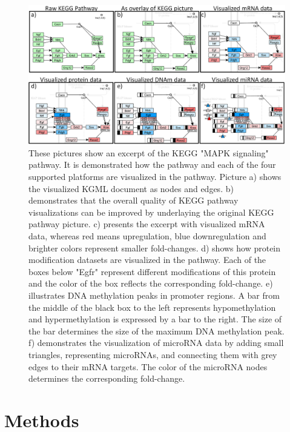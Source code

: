 \documentclass{bioinfo}
\begin{document}
\begin{figure}[t]
\centering
\includegraphics[width=1.0\textwidth]{figures/visualization-steps.png}
\caption{
These pictures show an excerpt of the KEGG "MAPK signaling" pathway. It is demonstrated how the pathway and each of the four supported platforms are visualized in the pathway. Picture a) shows the visualized KGML document as nodes and edges. b) demonstrates that the overall quality of KEGG pathway visualizations can be improved by underlaying the original KEGG pathway picture. c) presents the excerpt with visualized mRNA data, whereas red means upregulation, blue downregulation and brighter colors represent smaller fold-changes. d) shows how protein modification datasets are visualized in the pathway. Each of the boxes below "Egfr" represent different modifications of this protein and the color of the box reflects the corresponding fold-change. e) illustrates DNA methylation peaks in promoter regions. A bar from the middle of the black box to the left represents hypomethylation and hypermethylation is expressed by a bar to the right. The size of the bar determines the size of the maximum DNA methylation peak. f) demonstrates the visualization of microRNA data by adding small triangles, representing microRNAs, and connecting them with grey edges to their mRNA targets. The color of the microRNA nodes determines the corresponding fold-change.
}
\label{fig:visualization_steps}
\end{figure}


\section{Methods}
\end{document}
